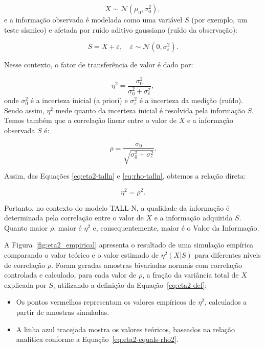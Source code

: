 \begin{equation}
X \sim \mathcal{N}(\mu_0, \sigma_0^2),
\label{eq:talln-prior}
\end{equation}
e a informação observada é modelada como uma variável $S$ (por exemplo, um teste sísmico) e afetada por ruído aditivo gaussiano (ruído da observação):

\begin{equation}
S = X + \varepsilon, 
\quad 
\varepsilon \sim \mathcal{N}(0, \sigma_\varepsilon^2).
\label{eq:talln-observation}
\end{equation}

Nesse contexto, o fator de transferência de valor é dado por:

\begin{equation}
\eta^2 = 
\frac{\sigma_0^2}{\sigma_0^2 + \sigma_\varepsilon^2},
\label{eq:eta2-talln}
\end{equation}
onde $\sigma_0^2$ é a incerteza inicial (a priori) e $\sigma_\varepsilon^2$ é a incerteza da medição (ruído). Sendo assim, $\eta^2$ mede quanto da incerteza inicial é resolvida pela informação $S$. Temos também que a correlação linear entre o valor de $X$ e a informação observada $S$ é:

\begin{equation}
\rho = 
\frac{\sigma_0}{\sqrt{\sigma_0^2 + \sigma_\varepsilon^2}}.
\label{eq:rho-talln}
\end{equation}

Assim, das Equações \eqref{eq:eta2-talln} e \eqref{eq:rho-talln}, obtemos a relação direta:

\begin{equation}
\eta^2 = \rho^2.
\label{eq:eta2-equals-rho2}
\end{equation}

Portanto, no contexto do modelo TALL-N, a qualidade da informação é determinada pela correlação entre o valor de $X$ e a informação adquirida $S$. Quanto maior $\rho$, maior é $\eta^2$ e, consequentemente, maior é o Valor da Informação.

A Figura~\ref{fig:eta2_empirical} apresenta o resultado de uma simulação empírica comparando o valor teórico e o valor estimado de $\eta^2(X|S)$ para diferentes níveis de correlação $\rho$. Foram geradas amostras bivariadas normais com correlação controlada e calculado, para cada valor de $\rho$, a fração da variância total de $X$ explicada por $S$, utilizando a definição da Equação~\ref{eq:eta2-def}: 
\begin{itemize}
  \item Os pontos vermelhos representam os valores empíricos de $\eta^2$, calculados a partir de amostras simuladas.
  \item A linha azul tracejada mostra os valores teóricos, baseados na relação analítica conforme a Equação~\ref{eq:eta2-equals-rho2}.
\end{itemize}

